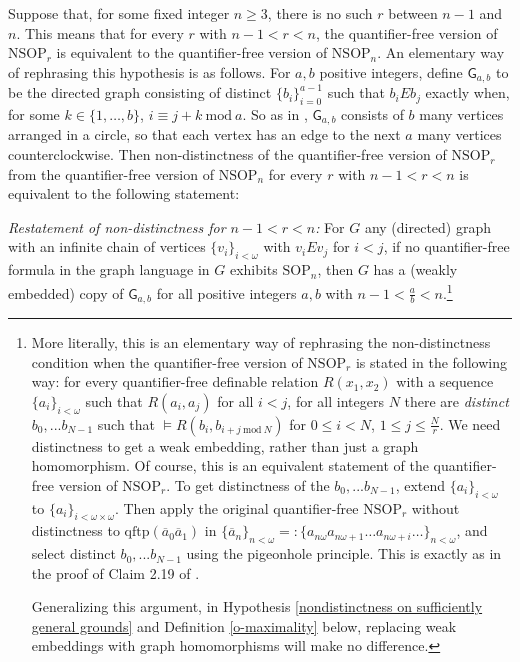 \documentclass{amsart}
\theoremstyle{definition}
\theoremstyle{remark}
\numberwithin{equation}{section}
\begin{document}
Suppose that, for some fixed integer $n \geq 3$, there is no such $r$ between $n - 1$ and $n$. This means that for every $r$ with $n -1 < r < n$, the quantifier-free version of $\mathrm{NSOP}_{r}$ is equivalent to the quantifier-free version of $\mathrm{NSOP}_{n}$. An elementary way of rephrasing this hypothesis is as follows. For $a, b$ positive integers, define $\mathsf{G}_{a, b}$ to be the directed graph consisting of distinct $\{b_{i}\}^{a-1}_{i = 0}$ such that $b_{i} E b_{j}$ exactly when, for some $k \in \{1, \ldots, b\}$, $i \equiv j+k \mathrm{\:mod\:} a$. So as in \cite{ApproxOrder}, $\mathsf{G}_{a, b}$ consists of $b$ many vertices arranged in a circle, so that each vertex has an edge to the next $a$ many vertices counterclockwise. Then non-distinctness of the quantifier-free version of $\mathrm{NSOP}_{r}$ from the quantifier-free version of $\mathrm{NSOP}_{n}$ for every $r$ with $n -1 < r < n$ is equivalent to the following statement:


\textit{Restatement of non-distinctness for $n -1 < r < n$:} For $G$ any (directed) graph with an infinite chain of vertices $\{v_{i}\}_{i < \omega}$ with $v_{i} E v_{j}$ for $i < j$, if no quantifier-free formula in the graph language in $G$ exhibits $\mathrm{SOP}_{n}$, then $G$ has a (weakly embedded) copy of $\mathsf{G}_{a, b}$ for all positive integers $a, b$ with $n -1 < \frac{a}{b} < n$.\footnote{More literally, this is an elementary way of rephrasing the non-distinctness condition when the quantifier-free version of $\mathrm{NSOP}_{r}$ is stated in the following way: for every quantifier-free definable relation $R(x_{1}, x_{2})$ with a sequence $\{a_{i}\}_{i < \omega}$ such that $R(a_{i}, a_{j})$ for all $i < j$, for all integers $N$ there are \textit{distinct} $b_{0}, ... b_{N-1}$ such that $\models R(b_{i}, b_{i+j \mathrm{\:mod\:} N })$ for $0 \leq i < N$, $1 \leq j \leq \frac{N}{r}$. We need distinctness to get a weak embedding, rather than just a graph homomorphism. Of course, this is an equivalent statement of the quantifier-free version of $\mathrm{NSOP}_{r}$. To get distinctness of the $b_{0}, ... b_{N-1}$, extend $\{a_{i}\}_{i< \omega}$ to $\{a_{i}\}_{i< \omega \times \omega}$. Then apply the original quantifier-free $\mathrm{NSOP}_{r}$ without distinctness to $\mathrm{qftp}(\overline{a}_{0}\overline{a}_{1})$ in $ \{\overline{a}_{n}\}_{n < \omega} =: \{a_{n \omega}a_{n\omega + 1}  \ldots a_{n \omega + i} \ldots \}_{n < \omega}$, and select distinct $b_{0}, ... b_{N-1}$ using the pigeonhole principle. This is exactly as in the proof of Claim 2.19 of \cite{ApproxOrder}.

Generalizing this argument, in Hypothesis \ref{nondistinctness on sufficiently general grounds} and Definition \ref{o-maximality} below, replacing weak embeddings with graph homomorphisms will make no difference. }
\end{document}
